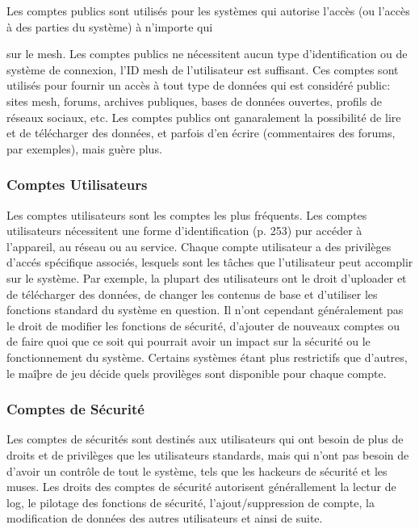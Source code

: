 Les comptes publics sont utilisés pour les systèmes qui autorise l'accès (ou l'accès à des parties du système) à n'importe qui 

sur le mesh. Les comptes publics ne nécessitent aucun type d'identification ou de système de connexion, l'ID mesh de l'utilisateur est suffisant. Ces comptes sont utilisés pour fournir un accès à tout type de données qui est considéré public: sites mesh, forums, archives publiques, bases de données ouvertes, profils de réseaux sociaux, etc. Les comptes publics ont ganaralement la possibilité de lire et de télécharger des données, et parfois d'en écrire (commentaires des forums, par exemples), mais guère plus. 

\subsubsection{Comptes Utilisateurs} 

Les comptes utilisateurs sont les comptes les plus fréquents. Les comptes utilisateurs nécessitent une forme d'identification (p. 253) pur accéder à l'appareil, au réseau ou au service. Chaque compte utilisateur a des privilèges d'accés spécifique associés, lesquels sont les tâches que l'utilisateur peut accomplir sur le système. Par exemple, la plupart des utilisateurs ont le droit d'uploader et de télécharger des données, de changer les contenus de base et d'utiliser les fonctions standard du système en question. Il n'ont cependant généralement pas le droit de modifier les fonctions de sécurité, d'ajouter de nouveaux comptes ou de faire quoi que ce soit qui pourrait avoir un impact sur la sécurité ou le fonctionnement du système. Certains systèmes étant plus restrictifs que d'autres, le maîþre de jeu décide quels provilèges sont disponible pour chaque compte. 

\subsubsection{Comptes de Sécurité} 

Les comptes de sécurités sont destinés aux utilisateurs qui ont besoin de plus de droits et de privilèges que les utilisateurs standards, mais qui n'ont pas besoin de d'avoir un contrôle de tout le système, tels que les hackeurs de sécurité et les muses. Les droits des comptes de sécurité autorisent générallement la lectur de log, le pilotage des fonctions de sécurité, l'ajout/suppression de compte, la modification de données des autres utilisateurs et ainsi de suite. 

